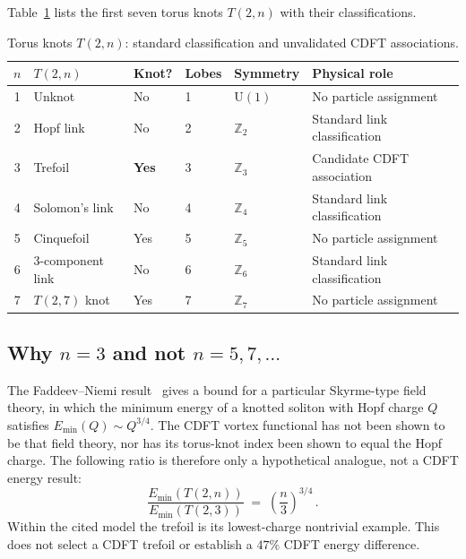 \documentclass[11pt]{article}
\begin{document}
Table~\ref{tab:torus_knots} lists the first seven torus knots $T(2,n)$ with
their classifications.

\begin{table}[h]
\caption{Torus knots $T(2,n)$: standard classification and unvalidated CDFT associations.}
  \label{tab:torus_knots}
  \begin{tabular}{clllll}
    \toprule
    $n$ & $T(2,n)$ & Knot? & Lobes & Symmetry & Physical role \\
    \midrule
    1 & Unknot              & No  & 1 & $\mathrm{U}(1)$ & No particle assignment \\
    2 & Hopf link           & No  & 2 & $\mathbb{Z}_2$  & Standard link classification \\
    3 & Trefoil             & \textbf{Yes} & 3 & $\mathbb{Z}_3$ & Candidate CDFT association \\
    4 & Solomon's link      & No  & 4 & $\mathbb{Z}_4$  & Standard link classification \\
    5 & Cinquefoil          & Yes & 5 & $\mathbb{Z}_5$  & No particle assignment \\
    6 & 3-component link    & No  & 6 & $\mathbb{Z}_6$  & Standard link classification \\
    7 & $T(2,7)$ knot       & Yes & 7 & $\mathbb{Z}_7$  & No particle assignment \\
    \bottomrule
  \end{tabular}
\end{table}

\subsection{Why $n = 3$ and not $n = 5, 7, \ldots$}

The Faddeev--Niemi result~\cite{FaddeevNiemi1997} gives a bound for a particular
Skyrme-type field theory, in which the minimum energy of a knotted soliton with Hopf charge $Q$ satisfies
$E_\text{min}(Q) \sim Q^{3/4}$.
The CDFT vortex functional has not been shown to be that field theory, nor has
its torus-knot index been shown to equal the Hopf charge. The following ratio is
therefore only a hypothetical analogue, not a CDFT energy result:
\begin{equation}
  \frac{E_\text{min}(T(2,n))}{E_\text{min}(T(2,3))}
  \;=\; \left(\frac{n}{3}\right)^{3/4}\,.
  \label{eq:energy_ratio}
\end{equation}
Within the cited model the trefoil is its lowest-charge nontrivial example. This
does not select a CDFT trefoil or establish a $47\%$ CDFT energy difference.
\end{document}
